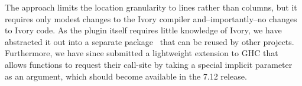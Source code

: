 The approach limits the location granularity to
lines rather than columns, but it requires only modest changes to the
Ivory compiler and--importantly--no changes to Ivory code. As the plugin
itself requires little knowledge of Ivory, we have abstracted it out into a
separate package~\cite{ghc-srcspan-plugin} that can be reused by other projects.
Furthermore, we have since submitted a lightweight extension to GHC that allows
functions to request their call-site by taking a special implicit
parameter~\cite{lewis2000implicit} as an argument, which should become available
in the 7.12 release.
